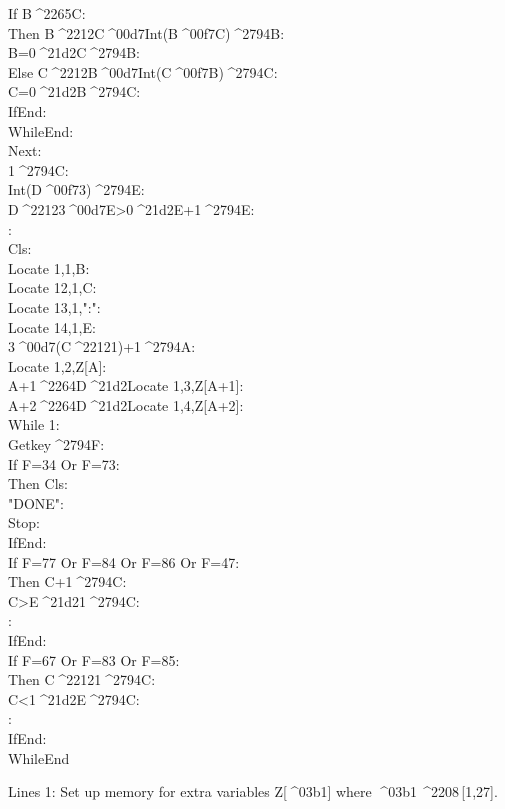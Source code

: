 \documentclass[11pt,letterpaper,twocolumn]{article}
\newcommand{\STO}{{\large ^^^^2794}}
\newcommand{\CBR}{{\Large ^^^^21d2}}
\newcommand{\LEQ}{^^^^2264}
\newcommand{\GEQ}{^^^^2265}
\newcommand{\MUL}{^^^^00d7}
\newcommand{\DIV}{^^^^00f7}
\newcommand{\MINUS}{^^^^2212}
\newcommand{\ELEM}{^^^^2208}
\newcommand{\ALPHA}{^^^^03b1}
\newcommand{\IDENT}[1]{\hspace*{#1\BaseIndent}}
\begin{document}
\begin{linenumbers}
\IDENT{2}If B\GEQ C:\\
\IDENT{3}Then B\MINUS C\MUL Int(B\DIV C)\STO B:\\
\IDENT{3}B=0\CBR C\STO B:\\
\IDENT{2}Else C\MINUS B\MUL Int(C\DIV B)\STO C:\\
\IDENT{3}C=0\CBR B\STO C:\\
\IDENT{2}IfEnd:\\
\IDENT{1}WhileEnd:\\
Next:\\
1\STO C:\\
Int(D\DIV 3)\STO E:\\
D\MINUS 3\MUL E>0\CBR E+1\STO E:\\
:\\
Cls:\\
Locate 1,1,B:\\
Locate 12,1,C:\\
Locate 13,1,":":\\
Locate 14,1,E:\\
3\MUL (C\MINUS 1)+1\STO A:\\
Locate 1,2,Z[A]:\\
A+1\LEQ D\CBR Locate 1,3,Z[A+1]:\\
A+2\LEQ D\CBR Locate 1,4,Z[A+2]:\\
While 1:\\
\IDENT{1}Getkey\STO F:\\
\IDENT{1}If F=34 Or F=73:\\
\IDENT{2}Then Cls:\\
\IDENT{2}"DONE":\\
\IDENT{2}Stop:\\
\IDENT{1}IfEnd:\\
\IDENT{1}If F=77 Or F=84 Or F=86 Or F=47:\\
\IDENT{2}Then C+1\STO C:\\
\IDENT{2}C>E\CBR 1\STO C:\\
\IDENT{2}:\\
\IDENT{1}IfEnd:\\
\IDENT{1}If F=67 Or F=83 Or F=85:\\
\IDENT{2}Then C\MINUS 1\STO C:\\
\IDENT{2}C<1\CBR E\STO C:\\
\IDENT{2}:\\
\IDENT{1}IfEnd:\\
WhileEnd
\end{linenumbers}

Lines 1: Set up memory for extra variables Z[\ALPHA] where \ALPHA\,\ELEM \,[1,27].
\end{document}
